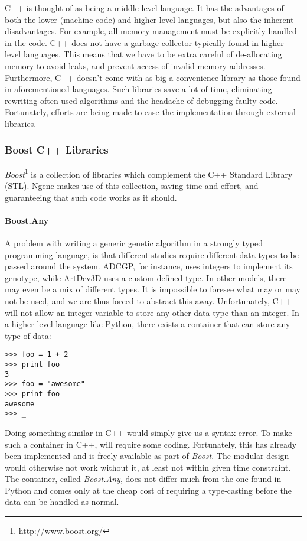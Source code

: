 C++ is thought of as being a middle level language. It has the advantages of both the lower (machine code) and higher level languages, but also the inherent disadvantages. For example, all memory management must be explicitly handled in the code. C++ does not have a garbage collector typically found in higher level languages. This means that we have to be extra careful of de-allocating memory to avoid leaks, and prevent access of invalid memory addresses. Furthermore, C++ doesn't come with as big a convenience library as those found in aforementioned languages. Such libraries save a lot of time, eliminating rewriting often used algorithms and the headache of debugging faulty code. Fortunately, efforts are being made to ease the implementation through external libraries.

\subsubsection{Boost C++ Libraries}
\emph{Boost}\footnote{\url{http://www.boost.org/}} is a collection of libraries which complement the C++ Standard Library (STL). Ngene makes use of this collection, saving time and effort, and guaranteeing that such code works as it should.

\paragraph{\textbf{Boost.Any}}\cite{henney2001}
A problem with writing a generic genetic algorithm in a strongly typed programming language, is that different studies require different data types to be passed around the system. ADCGP, for instance, uses integers to implement its genotype, while ArtDev3D uses a custom defined type. In other models, there may even be a mix of different types. It is impossible to foresee what may or may not be used, and we are thus forced to abstract this away. Unfortunately, C++ will not allow an integer variable to store any other data type than an integer. In a higher level language like Python, there exists a container that can store any type of data:

\begin{verbatim}
>>> foo = 1 + 2
>>> print foo
3
>>> foo = "awesome"
>>> print foo
awesome
>>> _
\end{verbatim}

Doing something similar in C++ would simply give us a syntax error. To make such a container in C++, will require some coding. Fortunately, this has already been implemented and is freely available as part of \emph{Boost}. The modular design would otherwise not work without it, at least not within given time constraint. The container, called \emph{Boost.Any}, does not differ much from the one found in Python and comes only at the cheap cost of requiring a type-casting before the data can be handled as normal.

